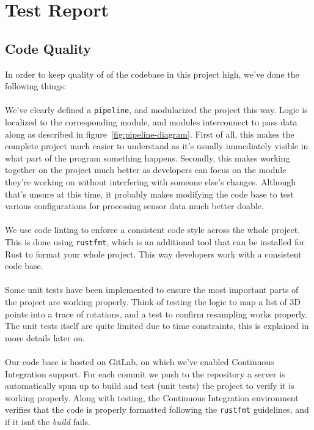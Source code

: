 \documentclass{standalone}
\begin{document}
  \section{Test Report}
  \subsection{Code Quality}
  In order to keep quality of of the codebase in this project high, we've done
  the following things:

  \paragraph{}
  We've clearly defined a \verb_pipeline_, and modularized the project this way.
  Logic is localized to the corresponding module, and modules interconnect to
  pass data along as described in figure~\ref{fig:pipeline-diagram}.
  First of all, this makes the complete project much easier to
  understand as it's usually immediately visible in what part of the program
  something happens. Secondly, this makes working together on the project much
  better as developers can focus on the module they're working on without
  interfering with someone else's changes. Although that's unsure at this time,
  it probably makes modifying the code base to test various configurations for
  processing sensor data much better doable.

  \paragraph{}
  We use code linting to enforce a consistent code style across the whole
  project. This is done using \verb_rustfmt_, which is an additional tool that
  can be installed for Rust to format your whole project. This way developers
  work with a consistent code base.

  \paragraph{}
  Some unit tests have been implemented to ensure the most important parts of
  the project are working properly. Think of testing the logic to map a list of
  3D points into a trace of rotations, and a test to confirm resampling works
  properly. The unit tests itself are quite limited due to time constraints,
  this is explained in more details later on.

  \paragraph{}
  Our code base is hosted on GitLab, on which we've enabled Continuous
  Integration support. For each commit we push to the repository a server is
  automatically spun up to build and test (unit tests) the project to verify
  it is working properly. Along with testing, the Continuous Integration
  environment verifies that the code is properly formatted following the
  \verb_rustfmt_ guidelines, and if it isn\'t the \emph{build} fails.
\end{document}
